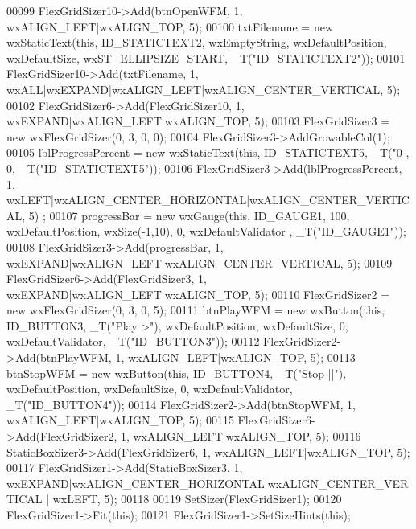 \begin{DoxyCode}
00099     FlexGridSizer10->Add(btnOpenWFM, 1, wxALIGN\_LEFT|wxALIGN\_TOP, 5);
00100     txtFilename = \textcolor{keyword}{new} wxStaticText(\textcolor{keyword}{this}, ID\_STATICTEXT2, wxEmptyString, wxDefaultPosition, wxDefaultSize, 
      wxST\_ELLIPSIZE\_START, _T(\textcolor{stringliteral}{"ID\_STATICTEXT2"}));
00101     FlexGridSizer10->Add(txtFilename, 1, wxALL|wxEXPAND|wxALIGN\_LEFT|wxALIGN\_CENTER\_VERTICAL, 5);
00102     FlexGridSizer6->Add(FlexGridSizer10, 1, wxEXPAND|wxALIGN\_LEFT|wxALIGN\_TOP, 5);
00103     FlexGridSizer3 = \textcolor{keyword}{new} wxFlexGridSizer(0, 3, 0, 0);
00104     FlexGridSizer3->AddGrowableCol(1);
00105     lblProgressPercent = \textcolor{keyword}{new} wxStaticText(\textcolor{keyword}{this}, ID\_STATICTEXT5, _T(\textcolor{stringliteral}{"0 %
      , 0, _T(\textcolor{stringliteral}{"ID\_STATICTEXT5"}));
00106     FlexGridSizer3->Add(lblProgressPercent, 1, wxLEFT|wxALIGN\_CENTER\_HORIZONTAL|wxALIGN\_CENTER\_VERTICAL, 5)
      ;
00107     progressBar = \textcolor{keyword}{new} wxGauge(\textcolor{keyword}{this}, ID\_GAUGE1, 100, wxDefaultPosition, wxSize(-1,10), 0, wxDefaultValidator
      , _T(\textcolor{stringliteral}{"ID\_GAUGE1"}));
00108     FlexGridSizer3->Add(progressBar, 1, wxEXPAND|wxALIGN\_LEFT|wxALIGN\_CENTER\_VERTICAL, 5);
00109     FlexGridSizer6->Add(FlexGridSizer3, 1, wxEXPAND|wxALIGN\_LEFT|wxALIGN\_TOP, 5);
00110     FlexGridSizer2 = \textcolor{keyword}{new} wxFlexGridSizer(0, 3, 0, 5);
00111     btnPlayWFM = \textcolor{keyword}{new} wxButton(\textcolor{keyword}{this}, ID\_BUTTON3, _T(\textcolor{stringliteral}{"Play >"}), wxDefaultPosition, wxDefaultSize, 0, 
      wxDefaultValidator, _T(\textcolor{stringliteral}{"ID\_BUTTON3"}));
00112     FlexGridSizer2->Add(btnPlayWFM, 1, wxALIGN\_LEFT|wxALIGN\_TOP, 5);
00113     btnStopWFM = \textcolor{keyword}{new} wxButton(\textcolor{keyword}{this}, ID\_BUTTON4, _T(\textcolor{stringliteral}{"Stop ||"}), wxDefaultPosition, wxDefaultSize, 0, 
      wxDefaultValidator, _T(\textcolor{stringliteral}{"ID\_BUTTON4"}));
00114     FlexGridSizer2->Add(btnStopWFM, 1, wxALIGN\_LEFT|wxALIGN\_TOP, 5);
00115     FlexGridSizer6->Add(FlexGridSizer2, 1, wxALIGN\_LEFT|wxALIGN\_TOP, 5);
00116     StaticBoxSizer3->Add(FlexGridSizer6, 1, wxALIGN\_LEFT|wxALIGN\_TOP, 5);
00117     FlexGridSizer1->Add(StaticBoxSizer3, 1, wxEXPAND|wxALIGN\_CENTER\_HORIZONTAL|wxALIGN\_CENTER\_VERTICAL | 
      wxLEFT, 5);
00118 
00119     SetSizer(FlexGridSizer1);
00120     FlexGridSizer1->Fit(\textcolor{keyword}{this});
00121     FlexGridSizer1->SetSizeHints(\textcolor{keyword}{this});
}
\end{DoxyCode}

